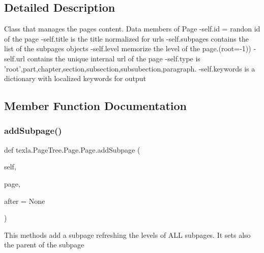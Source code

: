\subsection{Detailed Description}
\begin{DoxyVerb}Class that manages the pages content.
Data members of Page
-self.id = randon id of the page
-self.title is the title normalized for urls
-self.subpages contains the list of the subpages objects
-self.level memorize the level of the page.(root=-1))
-self.url contains the unique internal url of the page
-self.type is 'root',part,chapter,section,subsection,subsubection,paragraph.
-self.keywords is a dictionary with localized keywords for output\end{DoxyVerb}
 

\subsection{Member Function Documentation}
\hypertarget{classtexla_1_1PageTree_1_1Page_1_1Page_a2c10bde17648f6c1c4d0ddfba6300a62}{}\label{classtexla_1_1PageTree_1_1Page_1_1Page_a2c10bde17648f6c1c4d0ddfba6300a62} 
\subsubsection{\texorpdfstring{add\+Subpage()}{addSubpage()}}
{\footnotesize\ttfamily def texla.\+Page\+Tree.\+Page.\+Page.\+add\+Subpage (\begin{DoxyParamCaption}\item[{}]{self,  }\item[{}]{page,  }\item[{}]{after = {\ttfamily None} }\end{DoxyParamCaption})}

\begin{DoxyVerb}This methods add a subpage
refreshing the levels of ALL subpages.
It sets also the parent of the subpage\end{DoxyVerb}
 \hypertarget{classtexla_1_1PageTree_1_1Page_1_1Page_ad9d4ce2ebe5586474919d5e5e9d1eac8}{}\label{classtexla_1_1PageTree_1_1Page_1_1Page_ad9d4ce2ebe5586474919d5e5e9d1eac8} 
